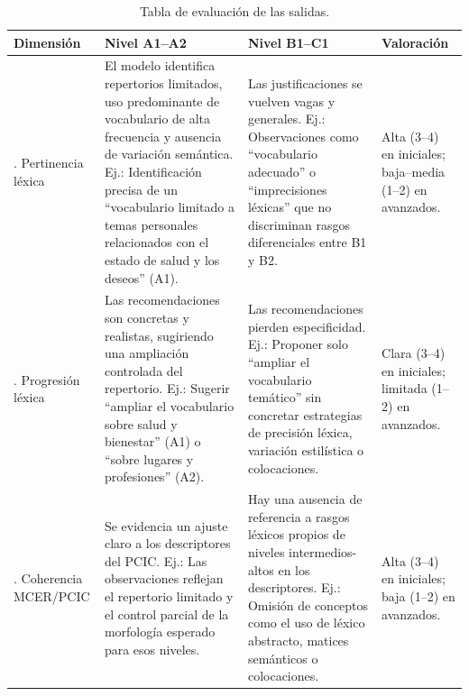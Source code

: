 \documentclass[spanish]{textolivre}
\begin{document}
\begin{table}[h]
\begingroup
\setlength{\tabcolsep}{3pt}
\small
    \caption{Tabla de evaluación de las salidas.}
    \label{tab5}
    \centering
    \renewcommand{\arraystretch}{1.8}
    \begin{tabular}{>{\raggedright\arraybackslash}p{2.5cm}>{\raggedright\arraybackslash}p{4.4cm}>{\raggedright\arraybackslash}p{4.4cm}>{\raggedright\arraybackslash}p{2.5cm}}
        \toprule
        Dimensión & Nivel A1--A2 & Nivel B1--C1 & Valoración \\
        \midrule
        1. Pertinencia léxica &
        El modelo identifica repertorios limitados, uso predominante de vocabulario de alta frecuencia y ausencia de variación semántica. Ej.: Identificación precisa de un ``vocabulario limitado a temas personales relacionados con el estado de salud y los deseos'' (A1). &
        Las justificaciones se vuelven vagas y generales. Ej.: Observaciones como ``vocabulario adecuado'' o ``imprecisiones léxicas'' que no discriminan rasgos diferenciales entre B1 y B2. &
        Alta (3--4) en iniciales; baja--media (1--2) en avanzados. \\
        2. Progresión léxica &
        Las recomendaciones son concretas y realistas, sugiriendo una ampliación controlada del repertorio. Ej.: Sugerir ``ampliar el vocabulario sobre salud y bienestar'' (A1) o ``sobre lugares y profesiones'' (A2). &
        Las recomendaciones pierden especificidad. Ej.: Proponer solo ``ampliar el vocabulario temático'' sin concretar estrategias de precisión léxica, variación estilística o colocaciones. &
        Clara (3--4) en iniciales; limitada (1--2) en avanzados. \\
        3. Coherencia MCER/PCIC &
        Se evidencia un ajuste claro a los descriptores del PCIC. Ej.: Las observaciones reflejan el repertorio limitado y el control parcial de la morfología esperado para esos niveles. &
        Hay una ausencia de referencia a rasgos léxicos propios de niveles intermedios-altos en los descriptores. Ej.: Omisión de conceptos como el uso de léxico abstracto, matices semánticos o colocaciones. &
        Alta (3--4) en iniciales; baja (1--2) en avanzados. \\
        \bottomrule
    \end{tabular}
\endgroup
\end{table}
\end{document}
